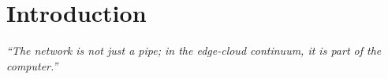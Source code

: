 \chapter{Introduction}
\label{ch:intro}

\begin{tcolorbox}[
  colback=bitspale,colframe=bitsgold,boxrule=0.6pt,arc=2pt,
  left=10pt,right=10pt,top=6pt,bottom=6pt,width=\textwidth
]
\small\itshape\color{bitsgray}
``The network is not just a pipe; in the edge-cloud continuum, it is part of the computer.''
\end{tcolorbox}

\vspace{0.4cm}
